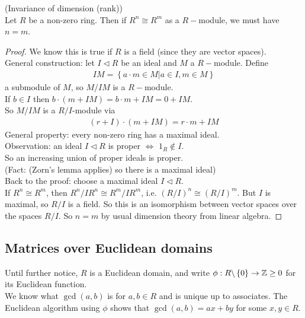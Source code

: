 \documentclass[a4paper]{article}
\begin{document}
\begin{prop} (Invariance of dimension (rank))\\
Let $R$ be a non-zero ring. Then if $R^n \cong R^m$ as a $R-$module, we must have $n=m$.
\begin{proof}
We know this is true if $R$ is a field (since they are vector spaces).\\
General construction: let $I\triangleleft R$ be an ideal and $M$ a $R-$module. Define
\begin{equation*}
\begin{aligned}
IM = \left\{ a\cdot m \in M | a\in I, m\in M\right\}
\end{aligned}
\end{equation*}
a submodule of $M$, so $M/IM$ is a $R-$module.\\
If $b\in I$ then $b\cdot \left(m+I M\right) = b\cdot m + IM = 0 + IM$.\\
So $M/IM$ is a $R/I$-module via
\begin{equation*}
\begin{aligned}
\left(r+I\right) \cdot \left(m+IM\right) = r\cdot m + IM
\end{aligned}
\end{equation*}
General property: every non-zero ring has a maximal ideal.\\
Observation: an ideal $I\triangleleft R$ is proper $\iff $ $1_R \not\in I$.\\
So an increasing union of proper ideals is proper.\\
(Fact: (Zorn's lemma applies) so there is a maximal ideal)\\
Back to the proof: choose a maximal ideal $I\triangleleft R$.\\
If $R^n \cong R^m$, then $R^n/IR^n \cong R^m / IR^m$, i.e. $\left(R/I\right)^n \cong \left(R/I\right)^m$. But $I$ is maximal, so $R/I$ is a field. So this is an isomorphism between vector spaces over the spaces $R/I$. So $n=m$ by usual dimension theory from linear algebra.
\end{proof}
\end{prop}

\subsection{Matrices over Euclidean domains}
Until further notice, $R$ is a Euclidean domain, and write $\phi: R\backslash\left\{0\right\} \to \mathbb{Z}\geq 0$ for its Euclidean function.\\
We know what $\gcd(a,b)$ is for $a,b\in R$ and is unique up to associates. The Euclidean algorithm using $\phi$ shows that $\gcd(a,b) = ax+by$ for some $x,y \in R$.
\end{document}
